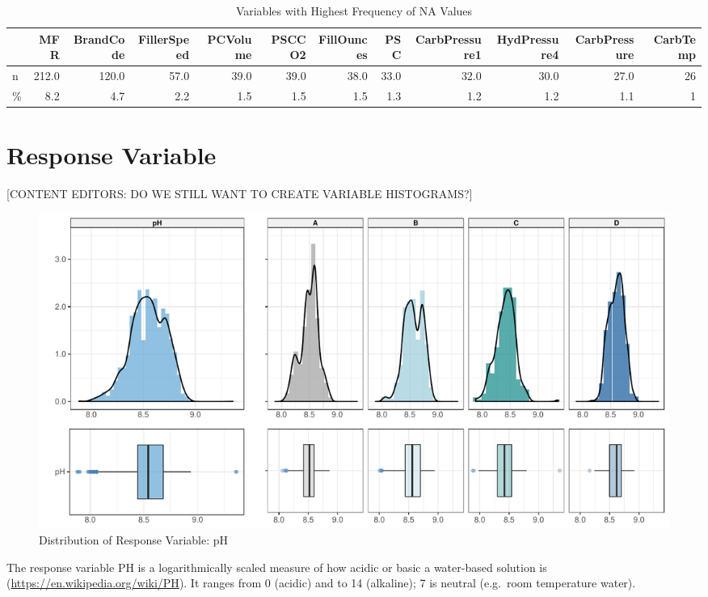 \documentclass[]{report}
\begin{document}
\begin{table}[H]

\caption{\label{tab:unnamed-chunk-2}Variables with Highest Frequency of NA Values}
\centering
\fontsize{8}{10}\selectfont
\begin{tabular}{lrrrrrrrrrrr}
\toprule
\textbf{ } & \textbf{MFR} & \textbf{BrandCode} & \textbf{FillerSpeed} & \textbf{PCVolume} & \textbf{PSCCO2} & \textbf{FillOunces} & \textbf{PSC} & \textbf{CarbPressure1} & \textbf{HydPressure4} & \textbf{CarbPressure} & \textbf{CarbTemp}\\
\midrule
\rowcolor{gray!6}  n & 212.0 & 120.0 & 57.0 & 39.0 & 39.0 & 38.0 & 33.0 & 32.0 & 30.0 & 27.0 & 26\\
\% & 8.2 & 4.7 & 2.2 & 1.5 & 1.5 & 1.5 & 1.3 & 1.2 & 1.2 & 1.1 & 1\\
\bottomrule
\end{tabular}
\end{table}

\hypertarget{response-variable}{%
\section{Response Variable}\label{response-variable}}

{[}CONTENT EDITORS: DO WE STILL WANT TO CREATE VARIABLE HISTOGRAMS?{]}

\begin{figure}

\hfill{}\includegraphics[width=1\textwidth]{Group2_Project2_Fall2019_files/figure-latex/unnamed-chunk-3-1} 

\caption{Distribution of Response Variable: pH}\label{fig:unnamed-chunk-3}
\end{figure}

The response variable PH is a logarithmically scaled measure of how
acidic or basic a water-based solution is
(\url{https://en.wikipedia.org/wiki/PH}). It ranges from 0 (acidic) and
to 14 (alkaline); 7 is neutral (e.g.~room temperature water).
\end{document}
